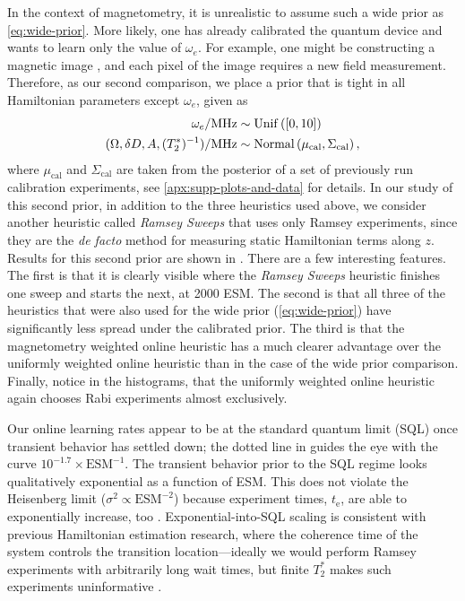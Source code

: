\documentclass[aps,nofootinbib,twocolumn,superscriptaddress]{revtex4}
\newcommand{\calib}{{\text{cal}}}
\newcommand{\te}{t_\text{e}}
\begin{document}
In the context of magnetometry, it is unrealistic to assume such a
wide prior as \autoref{eq:wide-prior}.
More likely, one has already calibrated the quantum device and wants to
learn only the value of $\omega_e$.
For example, one might be constructing a magnetic image
\cite{
    maletinsky_robust_2012,
    grinolds_nanoscale_2013,
    rondin_stray-field_2013},
and each
pixel of the image requires a new field measurement.
Therefore, as our second comparison, we place a prior that is tight in all
Hamiltonian parameters except $\omega_e$, given as
\begin{subequations}
\begin{align}
    \omega_e/\si{MHz}
        &\sim \uniformdist\left( [0, 10] \right) \\
    (\Omega,\delta D,A,(T_2^*)^{-1})/\si{MHz}
        &\sim \normaldist\left(
            \mu_\calib,
            \Sigma_\calib
        \right),
\end{align}
\label{eq:calibrated-prior}%
\end{subequations}
where $\mu_\calib$ and $\Sigma_\calib$ are taken
from the posterior of a set of previously run calibration
experiments, see \autoref{apx:supp-plots-and-data} for
details.
In our study of this second prior, in addition to
the three heuristics used above,
we consider another heuristic called \textit{Ramsey Sweeps} that uses only
Ramsey experiments, since they are the \textit{de facto} method for
measuring static Hamiltonian terms along $z$.
Results for this second prior
are shown in .
There are a few interesting features.
The first is that it is clearly visible where the \textit{Ramsey Sweeps}
heuristic finishes one sweep and starts the next, at 2000 ESM.
The second is that all three of the heuristics that were also used
for the wide prior (\autoref{eq:wide-prior}) have significantly
less spread under the calibrated prior.
The third is that the magnetometry weighted online heuristic has a much
clearer advantage over the uniformly weighted online heuristic than in
the case of the wide prior comparison.
Finally, notice in the histograms, that the uniformly weighted
online heuristic again chooses Rabi experiments almost
exclusively.

Our online
learning rates appear to be at the standard quantum limit (SQL)
once transient
behavior has settled down; the dotted line in  guides the eye with the
curve $10^{-1.7}\times\text{ESM}^{-1}$.
The transient behavior prior to the SQL regime
looks qualitatively exponential as a function of ESM.
This does not violate the Heisenberg limit
($\sigma^2\propto \text{ESM}^{-2}$) because experiment times,
$\te$, are able to exponentially increase, too
 \cite{sergeevich_characterization_2011}.
Exponential-into-SQL scaling is consistent with previous
Hamiltonian estimation research, where the coherence time of the system
controls the transition location---ideally we would
perform Ramsey experiments with arbitrarily long wait times, but
finite $T_2^*$ makes such experiments uninformative
\cite{ferrie_how_2013}.
\end{document}
